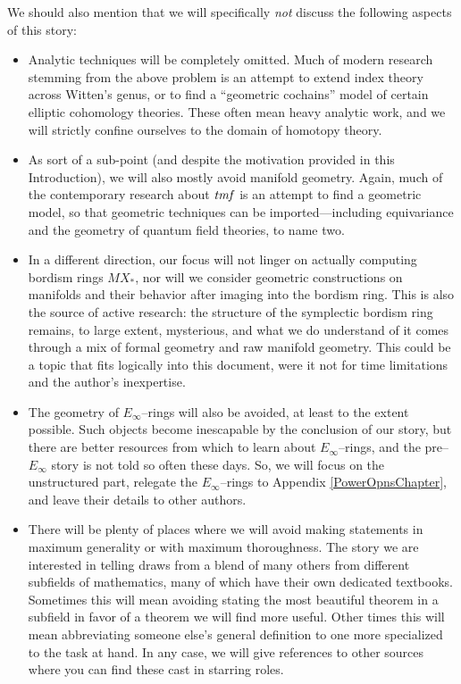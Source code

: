 We should also mention that we will specifically \emph{not} discuss the following aspects of this story:
\begin{itemize}
\item Analytic techniques will be completely omitted.  Much of modern research stemming from the above problem is an attempt to extend index theory across Witten's genus, or to find a ``geometric cochains'' model of certain elliptic cohomology theories.  These often mean heavy analytic work, and we will strictly confine ourselves to the domain of homotopy theory.
\item As sort of a sub-point (and despite the motivation provided in this Introduction), we will also mostly avoid manifold geometry.  Again, much of the contemporary research about $\mathit{tmf}$ is an attempt to find a geometric model, so that geometric techniques can be imported---including equivariance and the geometry of quantum field theories, to name two.
\item In a different direction, our focus will not linger on actually computing bordism rings $MX_*$, nor will we consider geometric constructions on manifolds and their behavior after imaging into the bordism ring.  This is also the source of active research: the structure of the symplectic bordism ring remains, to large extent, mysterious, and what we do understand of it comes through a mix of formal geometry and raw manifold geometry.  This could be a topic that fits logically into this document, were it not for time limitations and the author's inexpertise.
\item The geometry of $E_\infty$--rings will also be avoided, at least to the extent possible.  Such objects become inescapable by the conclusion of our story, but there are better resources from which to learn about $E_\infty$--rings, and the pre--$E_\infty$ story is not told so often these days.  So, we will focus on the unstructured part, relegate the $E_\infty$--rings to Appendix \ref{PowerOpnsChapter}, and leave their details to other authors.
\item There will be plenty of places where we will avoid making statements in maximum generality or with maximum thoroughness.  The story we are interested in telling draws from a blend of many others from different subfields of mathematics, many of which have their own dedicated textbooks.  Sometimes this will mean avoiding stating the most beautiful theorem in a subfield in favor of a theorem we will find more useful.  Other times this will mean abbreviating someone else's general definition to one more specialized to the task at hand.  In any case, we will give references to other sources where you can find these cast in starring roles.
\end{itemize}

